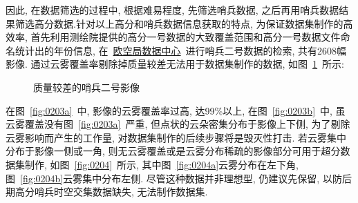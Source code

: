 因此, 在数据筛选的过程中, 根据难易程度, 先筛选哨兵数据, 之后再用哨兵数据结果筛选高分数据.针对以上高分和哨兵数据信息获取的特点, 为保证数据集制作的高效率, 首先利用测绘院提供的高分一号数据的大致覆盖范围和高分一号数据文件命名统计出的年份信息, 在~\href{https://scihub.copernicus.eu/dhus/#/home}{欧空局数据中心}~进行哨兵二号数据的检索, 共有2608幅影像. 通过云雾覆盖率剔除掉质量较差无法用于数据集制作的数据, 如图~\ref{fig:0203}~所示:

\begin{figure}[!htbp]
    \centering
    \quad
    \caption{质量较差的哨兵二号影像}
    \label{fig:0203}
\end{figure}

在图~\ref{fig:0203a}~中, 影像的云雾覆盖率过高, 达99\%以上, 在图~\ref{fig:0203b}~中, 虽云雾覆盖没有图~\ref{fig:0203a}~严重, 但点状的云朵密集分布于影像上下侧, 为了剔除云雾影响而产生的工作量, 对数据集制作的后续步骤将是毁灭性打击. 若云雾集中分布于影像一侧或一角, 则无云雾覆盖或是云雾分布稀疏的影像部分可用于超分数据集制作, 如图~\ref{fig:0204}~所示, 其中图~\ref{fig:0204a}云雾分布在左下角, 图~\ref{fig:0204b}云雾集中分布左侧. 尽管这种数据并非理想型, 仍建议先保留, 以防后期高分哨兵时空交集数据缺失, 无法制作数据集. 

